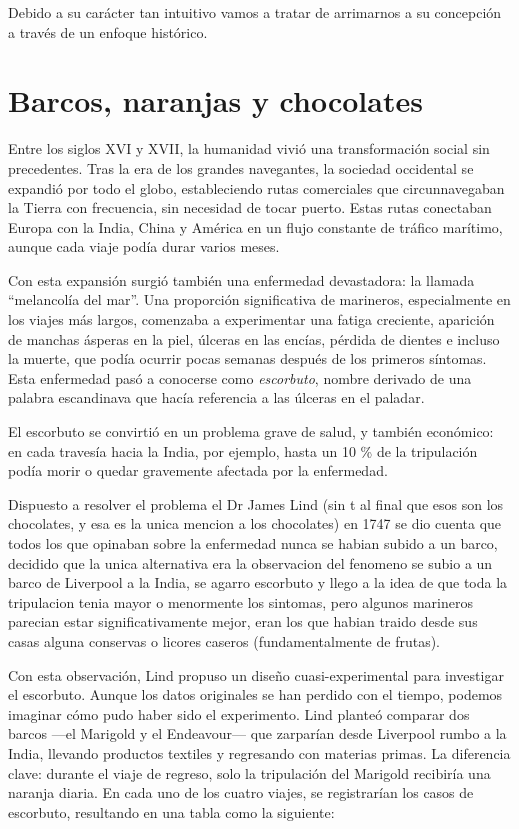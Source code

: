 \documentclass[
  letterpaper,
  DIV=11,
  numbers=noendperiod,
  oneside]{scrreprt}
\begin{document}
Debido a su carácter tan intuitivo vamos a tratar de arrimarnos a su
concepción a través de un enfoque histórico.

\hypertarget{barcos-naranjas-y-chocolates}{%
\section{Barcos, naranjas y chocolates
🍊}\label{barcos-naranjas-y-chocolates}}

Entre los siglos XVI y XVII, la humanidad vivió una transformación
social sin precedentes. Tras la era de los grandes navegantes, la
sociedad occidental se expandió por todo el globo, estableciendo rutas
comerciales que circunnavegaban la Tierra con frecuencia, sin necesidad
de tocar puerto. Estas rutas conectaban Europa con la India, China y
América en un flujo constante de tráfico marítimo, aunque cada viaje
podía durar varios meses.

Con esta expansión surgió también una enfermedad devastadora: la llamada
``melancolía del mar''. Una proporción significativa de marineros,
especialmente en los viajes más largos, comenzaba a experimentar una
fatiga creciente, aparición de manchas ásperas en la piel, úlceras en
las encías, pérdida de dientes e incluso la muerte, que podía ocurrir
pocas semanas después de los primeros síntomas. Esta enfermedad pasó a
conocerse como \emph{escorbuto}, nombre derivado de una palabra
escandinava que hacía referencia a las úlceras en el paladar.

El escorbuto se convirtió en un problema grave de salud, y también
económico: en cada travesía hacia la India, por ejemplo, hasta un 10 \%
de la tripulación podía morir o quedar gravemente afectada por la
enfermedad.

Dispuesto a resolver el problema el Dr James Lind (sin t al final que
esos son los chocolates, y esa es la unica mencion a los chocolates) en
1747 se dio cuenta que todos los que opinaban sobre la enfermedad nunca
se habian subido a un barco, decidido que la unica alternativa era la
observacion del fenomeno se subio a un barco de Liverpool a la India, se
agarro escorbuto y llego a la idea de que toda la tripulacion tenia
mayor o menormente los sintomas, pero algunos marineros parecian estar
significativamente mejor, eran los que habian traido desde sus casas
alguna conservas o licores caseros (fundamentalmente de frutas).

Con esta observación, Lind propuso un diseño cuasi-experimental para
investigar el escorbuto. Aunque los datos originales se han perdido con
el tiempo, podemos imaginar cómo pudo haber sido el experimento. Lind
planteó comparar dos barcos ---el Marigold y el Endeavour--- que
zarparían desde Liverpool rumbo a la India, llevando productos textiles
y regresando con materias primas. La diferencia clave: durante el viaje
de regreso, solo la tripulación del Marigold recibiría una naranja
diaria. En cada uno de los cuatro viajes, se registrarían los casos de
escorbuto, resultando en una tabla como la siguiente:
\end{document}
